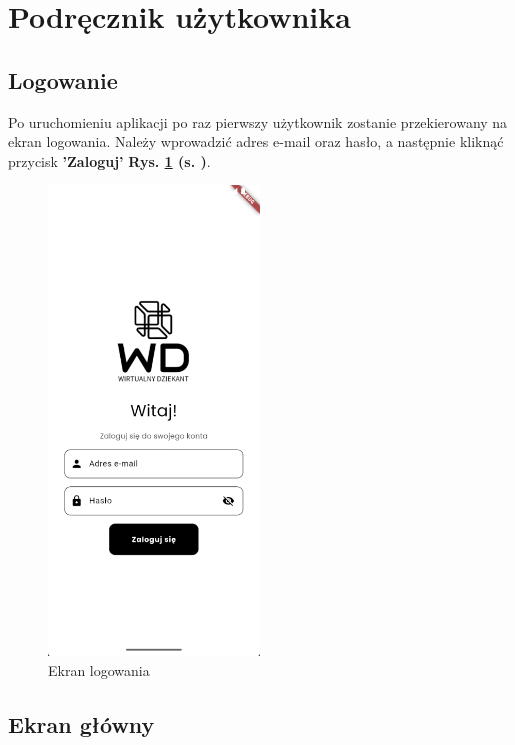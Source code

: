 \newpage
\section{Podręcznik użytkownika}  %
\subsection{Logowanie}

Po uruchomieniu aplikacji po raz pierwszy użytkownik zostanie przekierowany na ekran logowania. Należy wprowadzić adres e-mail oraz hasło, a następnie kliknąć przycisk \textbf{'Zaloguj' } \textbf{Rys. \ref{rys:ekranlogowania2} (s. \pageref{rys:ekranlogowania2})}.
\begin{figure}[h!]
	\centering
	\includegraphics[width=0.5\textwidth]{rys/ekranlogowania.png}
	\caption{Ekran logowania}
	\label{rys:ekranlogowania2}
\end{figure}

\subsection{Ekran główny}

